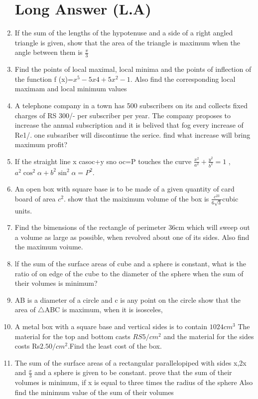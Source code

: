 \documentclass[12pt]{article}
\begin{document}
\begin{enumerate}
	\section*{Long Answer (L.A)}
\item If the sum of the lengths of the hypotenuse and a side of a right angled triangle is given, show that the area of the triangle is maximum when the angle between them is $\frac{\pi}{3}$
\item Find the points of local maximal, local minima and the points of inflection of the function f (x)=$x^5-5x4+5x^2-1$. Also find the corresponding local maximam and local minimum values
\item A telephone company in a town has 500 subscribers on its and collects fixed charges of RS 300/- per subscriber per year. The company proposes to increase the annual subscription and it is belived that fog every increase of Re1/. one subsariber will discontinue the serice. find what increase will bring maximum profit?
\item If the straight line x casoc+y sno oc=P touches the curve $\frac{x^2}{a^2}+\frac{y^2}{b^2}=1$ , $a^2 \cos^{2}\alpha+b^2 \sin^{2}\alpha=P^2$.
\item An open box with square base is to be made of a given quantity of card board of area $c^2$. show that the maiximum volume of the box is $\frac{c^23}{6\sqrt{3}}$cubic units.
\item Find the bimensions of the rectangle of perimeter 36cm which will sweep out a volume as large as possible, when revolved about one of its sides. Also find the maximum voiume.
\item lf the sum of the surface areas of cube and a sphere is constant, what is the ratio of on edge of the cube to the diameter of the sphere when the sum of their volumes is minimum?
\item AB is a diameter of a circle and c is any point on the circle show that the area of $\triangle$ABC is maximum, when it is isosceles,
\item A metal box with a square base and vertical sides is to contain $1024 cm^3$ The material for the top and bottom casts $RS 5/cm^2$ and the material for the sides costs Rs$2.50/cm^2$.Find the least cost of the box.
\item The sum of the surface areas of a rectangular parallelopiped with sides x,2x and $\frac{x}{3}$ and a sphere is given to be constant. prove that the sum of their volumes is minimum, if x is equal to three times the radius of the sphere Also find the minimum value of the sum of their volumes

\end{enumerate}
\end{document}
